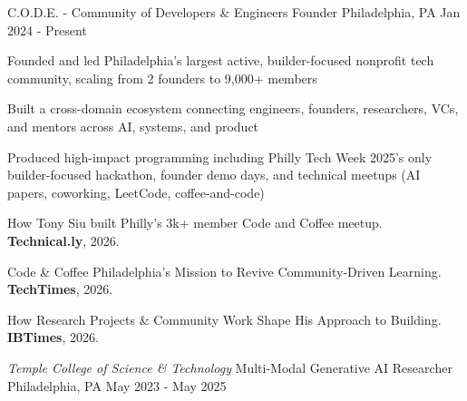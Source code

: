 \begin{cventries}
 \cventry
    {\emph{}} %
    {C.O.D.E. - Community of Developers \& Engineers Founder} %
    {Philadelphia, PA} %
    {Jan 2024 - Present} %
    {
    \begin{cvitems} %
      \item {Founded and led Philadelphia's largest active, builder-focused nonprofit tech community, scaling from 2 founders to 9,000+ members}
      \item {Built a cross-domain ecosystem connecting engineers, founders, researchers, VCs, and mentors across AI, systems, and product}
      \item {Produced high-impact programming including Philly Tech Week 2025's only builder-focused hackathon, founder demo days, and technical meetups (AI papers, coworking, LeetCode, coffee-and-code)}
      \item {How Tony Siu built Philly's 3k+ member Code and Coffee meetup. \textbf{Technical.ly}, 2026. \href{https://technical.ly/workforce/tony-siu-code-and-coffee-how-i-got-here/}{\faLink}}
      \item {Code \& Coffee Philadelphia's Mission to Revive Community-Driven Learning. \textbf{TechTimes}, 2026. \href{https://www.techtimes.com/articles/314602/20260212/code-coffee-philadelphias-mission-revive-community-driven-learning-strengthen-citys-tech.htm}{\faLink}}
      \item {How Research Projects \& Community Work Shape His Approach to Building. \textbf{IBTimes}, 2026. \href{https://www.ibtimes.com/tony-sius-longterm-path-how-research-projects-community-work-shape-his-approach-building-3796429}{\faLink}}
    \end{cvitems}
    }
 \cventry
    {\emph{Temple College of Science \& Technology}} %
    {Multi-Modal Generative AI Researcher} %
    {Philadelphia, PA} %
    {May 2023 - May 2025} %
    {
}
\end{cventries}
